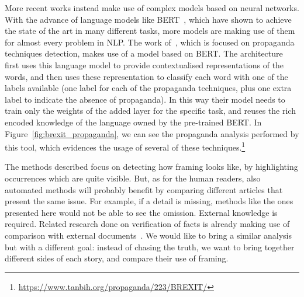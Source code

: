More recent works instead make use of complex models based on neural networks. With the advance of language models like BERT~\cite{devlin2018bert}, which have shown to achieve the state of the art in many different tasks,
more models are making use of them for almost every problem in NLP.
The work of~\citet{da2019fine}, which is focused on propaganda techniques detection, makes use of a model based on BERT.
The architecture first uses this language model to provide contextualised representations of the words, and then uses these representation to classify each word with one of the labels available (one label for each of the propaganda techniques, plus one extra label to indicate the absence of propaganda).
In this way their model needs to train only the weights of the added layer for the specific task, and reuses the rich encoded knowledge of the language owned by the pre-trained BERT.
In Figure~\ref{fig:brexit_propaganda}, we can see the propaganda analysis performed by this tool, which evidences the usage of several of these techniques.\footnote{\url{https://www.tanbih.org/propaganda/223/BREXIT/}}

The methods described focus on detecting how framing looks like, by highlighting occurrences which are quite visible.
But, as for the human readers, also automated methods will probably benefit by comparing different articles that present the same issue.
For example, if a detail is missing, methods like the ones presented here would not be able to see the omission.
External knowledge is required.
Related research done on verification of facts is already making use of comparison with external documents~\cite{yin2008truth,karadzhov2017fully}.
We would like to bring a similar analysis but with a different goal: instead of chasing the truth, we want to bring together different sides of each story, and compare their use of framing. 









